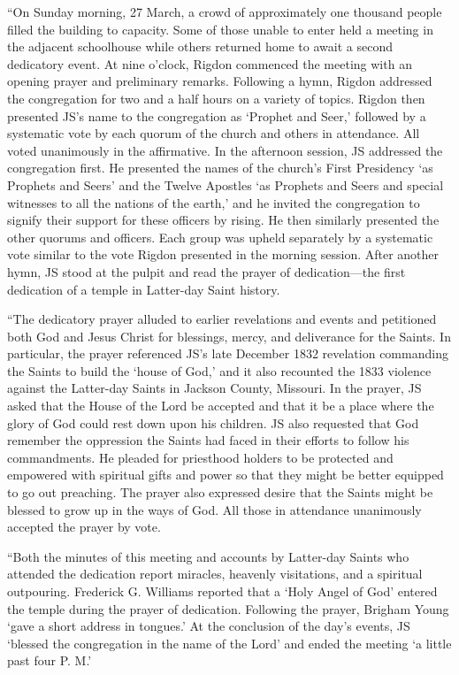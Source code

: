 			``On Sunday morning, 27 March, a crowd of approximately one thousand people filled the building to capacity. Some of those unable to enter held a meeting in the adjacent schoolhouse while others returned home to await a second dedicatory event. At nine o'clock, Rigdon commenced the meeting with an opening prayer and preliminary remarks. Following a hymn, Rigdon addressed the congregation for two and a half hours on a variety of topics. Rigdon then presented JS's name to the congregation as `Prophet and Seer,' followed by a systematic vote by each quorum of the church and others in attendance. All voted unanimously in the affirmative. In the afternoon session, JS addressed the congregation first. He presented the names of the church's First Presidency `as Prophets and Seers' and the Twelve Apostles `as Prophets and Seers and special witnesses to all the nations of the earth,' and he invited the congregation to signify their support for these officers by rising. He then similarly presented the other quorums and officers. Each group was upheld separately by a systematic vote similar to the vote Rigdon presented in the morning session. After another hymn, JS stood at the pulpit and read the prayer of dedication---the first dedication of a temple in Latter-day Saint history.

			``The dedicatory prayer alluded to earlier revelations and events and petitioned both God and Jesus Christ for blessings, mercy, and deliverance for the Saints. In particular, the prayer referenced JS's late December 1832 revelation commanding the Saints to build the `house of God,' and it also recounted the 1833 violence against the Latter-day Saints in Jackson County, Missouri. In the prayer, JS asked that the House of the Lord be accepted and that it be a place where the glory of God could rest down upon his children. JS also requested that God remember the oppression the Saints had faced in their efforts to follow his commandments. He pleaded for priesthood holders to be protected and empowered with spiritual gifts and power so that they might be better equipped to go out preaching. The prayer also expressed desire that the Saints might be blessed to grow up in the ways of God. All those in attendance unanimously accepted the prayer by vote.

			``Both the minutes of this meeting and accounts by Latter-day Saints who attended the dedication report miracles, heavenly visitations, and a spiritual outpouring. Frederick G. Williams reported that a `Holy Angel of God' entered the temple during the prayer of dedication. Following the prayer, Brigham Young `gave a short address in tongues.' At the conclusion of the day's events, JS `blessed the congregation in the name of the Lord' and ended the meeting `a little past four P. M.'

